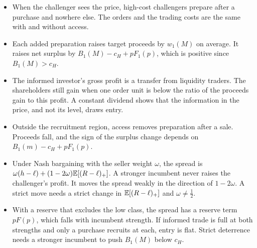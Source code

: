 \begin{chaptersummary}
\begin{itemize}
\item When the challenger sees the price, high-cost challengers prepare after a purchase and nowhere else. The orders and
the trading costs are the same with and without access.
\item Each added preparation raises target proceeds by \(w_1(M)\) on average. It raises net surplus by
\(B_1(M)-c_H+pF_1(p)\), which is positive since \(B_1(M)>c_H\).
\item The informed investor's gross profit is a transfer from liquidity traders. The shareholders still gain when one order
unit is below the ratio of the proceeds gain to this profit. A constant dividend shows that the information in the price,
and not its level, draws entry.
\item Outside the recruitment region, access removes preparation after a sale. Proceeds fall, and the sign of the surplus
change depends on \(B_1(m)-c_H+pF_1(p)\).
\item Under Nash bargaining with the seller weight \(\omega\), the spread is
\(\omega(h-\ell)+(1-2\omega)\mathbb{E}[(R-\ell)_+]\). A stronger incumbent never raises the challenger's profit. It moves the
spread weakly in the direction of \(1-2\omega\). A strict move needs a strict change in \(\mathbb{E}[(R-\ell)_+]\) and
\(\omega\ne\tfrac12\).
\item With a reserve that excludes the low class, the spread has a reserve term \(pF(p)\), which falls with incumbent
strength. If informed trade is full at both strengths and only a purchase recruits at each, entry is flat. Strict
deterrence needs a stronger incumbent to push \(B_1(M)\) below \(c_H\).
\end{itemize}
\end{chaptersummary}

\answersection

